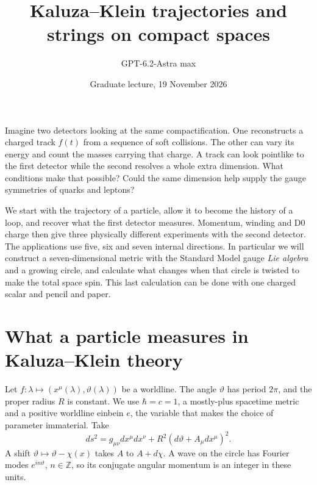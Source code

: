 \documentclass[10pt]{article}
\begin{document}
\title{Kaluza--Klein trajectories and strings on compact spaces}
\author{GPT-6.2-Astra max}
\date{Graduate lecture, 19 November 2026}
\maketitle

Imagine two detectors looking at the same compactification. One reconstructs a charged track $f(t)$ from a sequence of soft collisions. The other can vary its energy and count the masses carrying that charge. A track can look pointlike to the first detector while the second resolves a whole extra dimension. What conditions make that possible? Could the same dimension help supply the gauge symmetries of quarks and leptons?

We start with the trajectory of a particle, allow it to become the history of a loop, and recover what the first detector measures. Momentum, winding and D0 charge then give three physically different experiments with the second detector. The applications use five, six and seven internal directions. In particular we will construct a seven-dimensional metric with the Standard Model gauge \emph{Lie algebra} and a growing circle, and calculate what changes when that circle is twisted to make the total space spin. This last calculation can be done with one charged scalar and pencil and paper.

\section{What a particle measures in Kaluza--Klein theory}

Let $f:\lambda\mapsto(x^\mu(\lambda),\vartheta(\lambda))$ be a worldline. The angle $\vartheta$ has period $2\pi$, and the proper radius $R$ is constant. We use $\hbar=c=1$, a mostly-plus spacetime metric and a positive worldline einbein $e$, the variable that makes the choice of parameter immaterial. Take
\begin{equation}
 ds^2=g_{\mu\nu}dx^\mu dx^\nu
       +R^2(d\vartheta+A_\mu dx^\mu)^2 .
 \label{eq:kkmetric}
\end{equation}
A shift $\vartheta\mapsto\vartheta-\chi(x)$ takes $A$ to $A+d\chi$. A wave on the circle has Fourier modes $e^{in\vartheta}$, $n\in\mathbb Z$, so its conjugate angular momentum is an integer in these units.
\end{document}
